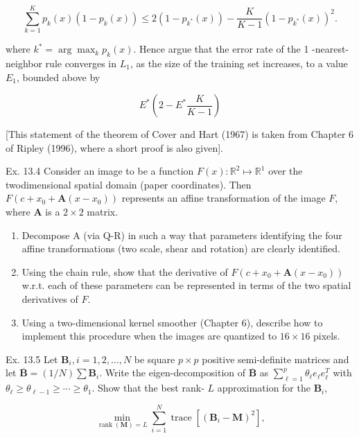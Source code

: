\documentclass[10pt]{article}
\begin{document}
$$
\sum_{k=1}^{K} p_{k}(x)\left(1-p_{k}(x)\right) \leq 2\left(1-p_{k^{*}}(x)\right)-\frac{K}{K-1}\left(1-p_{k^{*}}(x)\right)^{2} .
$$

where $k^{*}=\arg \max _{k} p_{k}(x)$. Hence argue that the error rate of the 1 -nearest-neighbor rule converges in $L_{1}$, as the size of the training set increases, to a value $E_{1}$, bounded above by


\begin{equation*}
E^{*}\left(2-E^{*} \frac{K}{K-1}\right) \tag{13.12}
\end{equation*}


[This statement of the theorem of Cover and Hart (1967) is taken from Chapter 6 of Ripley (1996), where a short proof is also given].

Ex. 13.4 Consider an image to be a function $F(x): \mathbb{R}^{2} \mapsto \mathbb{R}^{1}$ over the twodimensional spatial domain (paper coordinates). Then $F\left(c+x_{0}+\mathbf{A}\left(x-x_{0}\right)\right)$ represents an affine transformation of the image $F$, where $\mathbf{A}$ is a $2 \times 2$ matrix.

\begin{enumerate}
  \item Decompose A (via Q-R) in such a way that parameters identifying the four affine transformations (two scale, shear and rotation) are clearly identified.
  \item Using the chain rule, show that the derivative of $F\left(c+x_{0}+\mathbf{A}\left(x-x_{0}\right)\right)$ w.r.t. each of these parameters can be represented in terms of the two spatial derivatives of $F$.
  \item Using a two-dimensional kernel smoother (Chapter 6), describe how to implement this procedure when the images are quantized to $16 \times 16$ pixels.
\end{enumerate}

Ex. 13.5 Let $\mathbf{B}_{i}, i=1,2, \ldots, N$ be square $p \times p$ positive semi-definite matrices and let $\overline{\mathbf{B}}=(1 / N) \sum \mathbf{B}_{i}$. Write the eigen-decomposition of $\overline{\mathbf{B}}$ as $\sum_{\ell=1}^{p} \theta_{\ell} e_{\ell} e_{\ell}^{T}$ with $\theta_{\ell} \geq \theta_{\ell-1} \geq \cdots \geq \theta_{1}$. Show that the best rank- $L$ approximation for the $\mathbf{B}_{i}$,

$$
\min _{\operatorname{rank}(\mathbf{M})=L} \sum_{i=1}^{N} \operatorname{trace}\left[\left(\mathbf{B}_{i}-\mathbf{M}\right)^{2}\right],
$$
\end{document}
